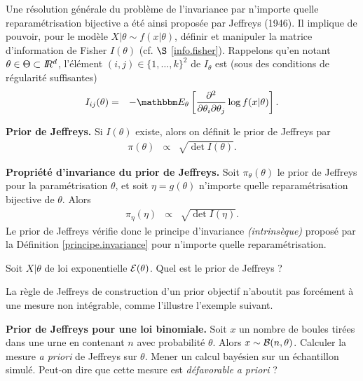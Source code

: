 Une résolution générale du problème de l'invariance par n'importe quelle reparamétrisation bijective a été ainsi proposée par Jeffreys (1946). Il implique de pouvoir, pour le modèle $X|\theta\sim f(x|\theta)$, définir et manipuler la matrice d'information de Fisher $I({\theta})$ (cf. $\S$ \ref{info.fisher}). Rappelons qu'en notant $\theta\in\Theta\subset I\!\!R^d$, l'élément $(i,j)\in\{1,\ldots,k\}^2$ de $I_{\theta}$ est (sous des conditions de régularité suffisantes)
\begin{eqnarray*}
I_{ij}(\theta) & = & -\E_{\theta}\left[\frac{\partial^2}{\partial\theta_i\partial\theta_j} \log f(x|\theta)\right]. 
\end{eqnarray*} 

\begin{definition}{\bf Prior de Jeffreys.}
Si $I(\theta)$ existe, alors on définit le prior de Jeffreys par
\begin{eqnarray*}
\pi(\theta) & \propto & \sqrt{\det I({\theta})}.
\end{eqnarray*}
\end{definition}


\begin{theorem}{\bf Propriété d'invariance du prior de Jeffreys.}
Soit $\pi_{\theta}(\theta)$ le prior de Jeffreys pour la paramétrisation $\theta$, et soit $\eta=g(\theta)$ n'importe quelle reparamétrisation bijective de $\theta$. Alors
\begin{eqnarray*}
\pi_{\eta}(\eta) & \propto & \sqrt{\det I({\eta})}.
\end{eqnarray*}
Le prior de Jeffreys vérifie donc le principe d'invariance {\it (intrinsèque)} proposé par la Définition \ref{principe.invariance}  pour n'importe quelle reparamétrisation.   
\end{theorem}

\if{} \vspace{1cm} 
\fi
\vspace{0.5cm}

\begin{exec}
Soit $X|\theta$ de loi exponentielle ${\cal{E}}(\theta)$. Quel est le prior de Jeffreys ?
\end{exec}

La règle de Jeffreys de construction d'un prior objectif n'aboutit pas forcément à une mesure non intégrable, comme l'illustre l'exemple suivant. 

\begin{exec}{\bf Prior de Jeffreys pour une loi binomiale.}\label{exobino}
Soit $x$ un nombre de boules tirées dans une urne en contenant $n$ avec probabilité $\theta$. Alors $x\sim {\cal{B}}(n,\theta)$. Calculer la mesure {\it a priori} de Jeffreys sur $\theta$. Mener un calcul bayésien sur un échantillon simulé. Peut-on dire que cette mesure est {\it défavorable} {\it a priori} ? 
\end{exec}

